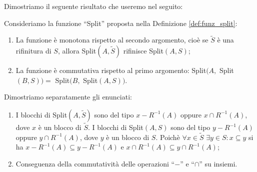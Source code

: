 Dimostriamo il seguente risultato che useremo nel seguito:
\begin{theorem}
    \label{theo:split_properties}
    Consideriamo la funzione ``Split'' proposta nella Definizione \ref{def:funz_split}:
    \begin{enumerate}
        \item La funzione è monotona rispetto al secondo argomento, cioè se $\widetilde{S}$ è una rifinitura di $S$, allora Split$(A,\widetilde{S})$ rifinisce Split$(A,S)$;
        \item La funzione è commutativa rispetto al primo argomento: Split$(A,$ Split$(B,S)) =$ Split$(B,$ Split$(A,S))$.
    \end{enumerate}
\end{theorem}
\begin{proof2}
    Dimostriamo separatamente gli enunciati:
    \begin{enumerate}
        \item I blocchi di Split$(A,\widetilde{S})$ sono del tipo $x - R^{-1}(A)$ oppure $x \cap R^{-1}(A)$, dove $x$ è un blocco di $\widetilde{S}$. I blocchi di Split$(A,S)$ sono del tipo $y - R^{-1}(A)$ oppure $y \cap R^{-1}(A)$, dove $y$ è un blocco di $S$. Poichè $\forall x \in \widetilde{S} \,\,\exists y \in S : x \subseteq y$ si ha $x - R^{-1}(A) \subseteq y - R^{-1}(A)$ e $x \cap R^{-1}(A) \subseteq y \cap R^{-1}(A)$;
        \item Conseguenza della commutatività delle operazioni ``$-$'' e ``$\cap$'' su insiemi.
    \end{enumerate}
    \vspace*{-0.75cm}
\end{proof2}

